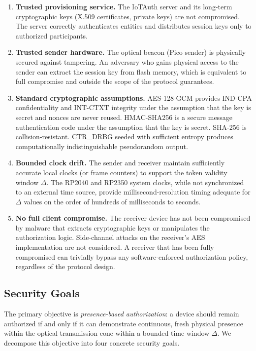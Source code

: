 \documentclass[conference]{IEEEtran}
\begin{document}
\begin{enumerate}
\item \textbf{Trusted provisioning service.} The IoTAuth server and its long-term cryptographic keys (X.509 certificates, private keys) are not compromised. The server correctly authenticates entities and distributes session keys only to authorized participants.

\item \textbf{Trusted sender hardware.} The optical beacon (Pico sender) is physically secured against tampering. An adversary who gains physical access to the sender can extract the session key from flash memory, which is equivalent to full compromise and outside the scope of the protocol guarantees.

\item \textbf{Standard cryptographic assumptions.} AES-128-GCM provides IND-CPA confidentiality and INT-CTXT integrity under the assumption that the key is secret and nonces are never reused. HMAC-SHA256 is a secure message authentication code under the assumption that the key is secret. SHA-256 is collision-resistant. CTR\_DRBG seeded with sufficient entropy produces computationally indistinguishable pseudorandom output.

\item \textbf{Bounded clock drift.} The sender and receiver maintain sufficiently accurate local clocks (or frame counters) to support the token validity window $\Delta$. The RP2040 and RP2350 system clocks, while not synchronized to an external time source, provide millisecond-resolution timing adequate for $\Delta$ values on the order of hundreds of milliseconds to seconds.

\item \textbf{No full client compromise.} The receiver device has not been compromised by malware that extracts cryptographic keys or manipulates the authorization logic. Side-channel attacks on the receiver's AES implementation are not considered. A receiver that has been fully compromised can trivially bypass any software-enforced authorization policy, regardless of the protocol design.
\end{enumerate}

\subsection{Security Goals}

The primary objective is \emph{presence-based authorization}: a device should remain authorized if and only if it can demonstrate continuous, fresh physical presence within the optical transmission cone within a bounded time window $\Delta$. We decompose this objective into four concrete security goals.
\end{document}
